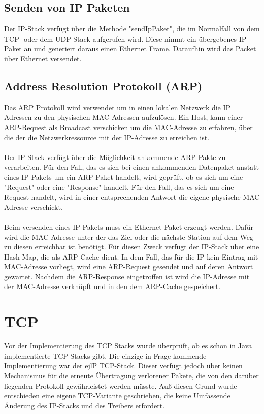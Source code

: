 \subsection{Senden von IP Paketen}
Der IP-Stack verfügt über die Methode "sendIpPaket", die im Normalfall von dem TCP- oder dem UDP-Stack aufgerufen wird. Diese nimmt ein übergebenes IP-Paket an und generiert daraus einen Ethernet Frame. Daraufhin wird das Packet über Ethernet versendet. 


\subsection{Address Resolution Protokoll (ARP)}
Das ARP Protokoll wird verwendet um in einen lokalen Netzwerk die IP Adressen zu den physischen MAC-Adressen aufzulösen. Ein Host, kann einer ARP-Request als Broadcast verschicken um die MAC-Adresse zu erfahren, über die der die Netzwerkressource mit der IP-Adresse zu erreichen ist. \\\\

Der IP-Stack verfügt über die Möglichkeit ankommende ARP Pakte zu verarbeiten. Für den Fall, das es sich bei einen ankommenden Datenpaket anstatt eines IP-Pakets um ein ARP-Paket handelt, wird geprüft, ob es sich um eine {}"Request"{} oder eine {}"Response"{} handelt. Für den Fall, das es sich um eine Request handelt, wird in einer entsprechenden Antwort die eigene physische MAC Adresse verschickt. \\\\

Beim versenden eines IP-Pakets muss ein Ethernet-Paket erzeugt werden. Dafür wird die MAC-Adresse unter der das Ziel oder die nächste Station auf dem Weg zu diesen erreichbar ist benötigt. Für diesen Zweck verfügt der IP-Stack über eine Hash-Map, die als ARP-Cache dient. In dem Fall, das für die IP kein Eintrag mit MAC-Adresse vorliegt, wird eine ARP-Request gesendet und auf deren Antwort gewartet. Nachdem die ARP-Response eingetroffen ist wird die IP-Adresse mit der MAC-Adresse verknüpft und in den dem ARP-Cache gespeichert. 


 



\section{TCP}

Vor der Implementierung des TCP Stacks wurde überprüft, ob es schon in Java implementierte TCP-Stacks gibt. Die einzige in Frage kommende Implementierung war der ejlP TCP-Stack. Dieser verfügt jedoch über keinen Mechanismus für die erneute Übertragung verlorener Pakete, die von den darüber liegenden Protokoll gewährleistet werden müsste. Auß diesen Grund wurde entschieden eine eigene TCP-Variante geschrieben, die keine Umfassende Änderung des IP-Stacks und des Treibers erfordert. 



